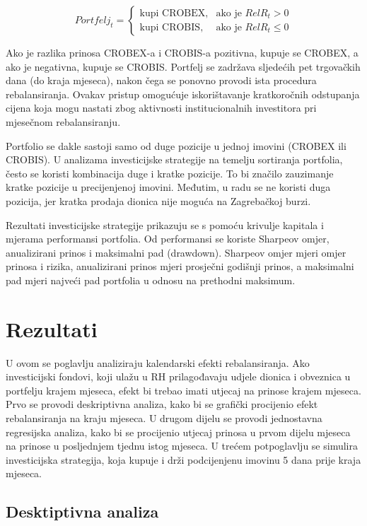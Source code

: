 \documentclass[
  letterpaper,
  DIV=11,
  numbers=noendperiod]{scrartcl}
\begin{document}
\[
Portfelj_{t} = 
\begin{cases}
\text{kupi CROBEX}, & \text{ako je } RelR_{t} > 0 \\[6pt]
\text{kupi CROBIS}, & \text{ako je } RelR_{t} \leq 0
\end{cases}
\]

Ako je razlika prinosa CROBEX-a i CROBIS-a pozitivna, kupuje se CROBEX,
a ako je negativna, kupuje se CROBIS. Portfelj se zadržava sljedećih pet
trgovačkih dana (do kraja mjeseca), nakon čega se ponovno provodi ista
procedura rebalansiranja. Ovakav pristup omogućuje iskorištavanje
kratkoročnih odstupanja cijena koja mogu nastati zbog aktivnosti
institucionalnih investitora pri mjesečnom rebalansiranju.

Portfolio se dakle sastoji samo od duge pozicije u jednoj imovini
(CROBEX ili CROBIS). U analizama investicijske strategije na temelju
sortiranja portfolia, često se koristi kombinacija duge i kratke
pozicije. To bi značilo zauzimanje kratke pozicije u precijenjenoj
imovini. Međutim, u radu se ne koristi duga pozicija, jer kratka prodaja
dionica nije moguća na Zagrebačkoj burzi.

Rezultati investicijske strategije prikazuju se s pomoću krivulje
kapitala i mjerama performansi portfolia. Od performansi se koriste
Sharpeov omjer, anualizirani prinos i maksimalni pad (drawdown).
Sharpeov omjer mjeri omjer prinosa i rizika, anualizirani prinos mjeri
prosječni godišnji prinos, a maksimalni pad mjeri najveći pad portfolia
u odnosu na prethodni maksimum.

\section{Rezultati}\label{rezultati}

U ovom se poglavlju analiziraju kalendarski efekti rebalansiranja. Ako
investicijski fondovi, koji ulažu u RH prilagođavaju udjele dionica i
obveznica u portfelju krajem mjeseca, efekt bi trebao imati utjecaj na
prinose krajem mjeseca. Prvo se provodi deskriptivna analiza, kako bi se
grafički procijenio efekt rebalansiranja na kraju mjeseca. U drugom
dijelu se provodi jednostavna regresijska analiza, kako bi se procijenio
utjecaj prinosa u prvom dijelu mjeseca na prinose u posljednjem tjednu
istog mjeseca. U trećem potpoglavlju se simulira investicijska
strategija, koja kupuje i drži podcijenjenu imovinu 5 dana prije kraja
mjeseca.

\subsection{Desktiptivna analiza}\label{desktiptivna-analiza}
\end{document}
